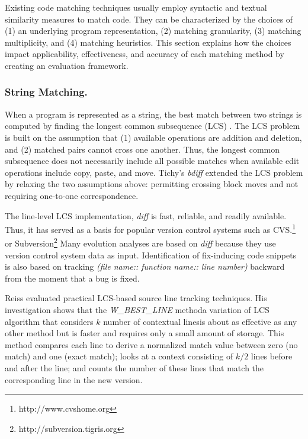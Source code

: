 \documentclass[runningheads,a4paper]{llncs}
\begin{document}
Existing code matching techniques usually employ syntactic and textual similarity measures to match code. They can be characterized by the choices of (1) an underlying program representation, (2) matching granularity, (3) matching multiplicity, and (4) matching heuristics. This section explains how the choices impact applicability, effectiveness, and accuracy of each matching method by creating an evaluation framework. 

\subsubsection{String Matching.}
When a program is represented as a string, the best match between two strings is computed by finding the longest common subsequence (LCS) \cite{Apostolico1997}. The LCS problem is built on the assumption that (1) available operations are addition and deletion, and (2) matched pairs cannot cross one another. Thus, the longest common subsequence does not necessarily include all possible matches when available edit operations include copy, paste, and move. Tichy's \textit{bdiff} \cite{Tichy1984} extended the LCS problem by relaxing the two assumptions above: permitting crossing block moves and not requiring one-to-one correspondence. 

The line-level LCS implementation, \textit{diff} \cite{Hunt1977:LCS} is fast, reliable, and readily available. Thus, it has served as a basis for popular version control systems such as CVS.\footnote{http://www.cvshome.org} or Subversion\footnote{http://subversion.tigris.org} Many evolution analyses are based on {\it diff} because they use version control system data as input. Identification of fix-inducing code snippets \cite{Sliwerski:2005} is also based on tracking \textit{(file name:: function name:: line number)} backward from the moment that a bug is fixed.  

Reiss \cite{Reiss2008} evaluated practical LCS-based source line tracking techniques. His investigation shows that the {\it W\_BEST\_LINE} method\textemdash  a variation of LCS algorithm that considers $k$ number of contextual lines\textemdash is about as effective as any other method but is faster and requires only a small amount of storage. This method compares each line to derive a normalized match value between zero (no match) and one (exact match); looks at a context consisting of $k/2$ lines before and after the line; and counts the number of these lines that match the corresponding line in the new version.  
\end{document}
